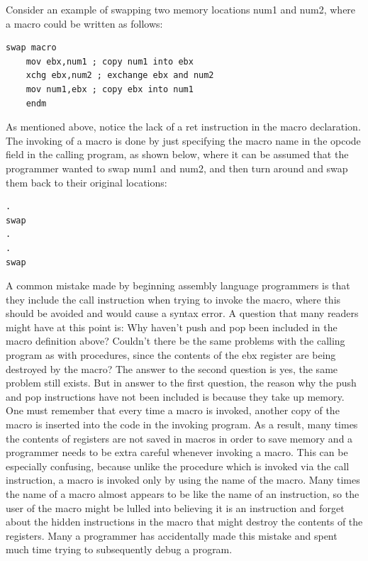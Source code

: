 \documentclass[10pt]{book}
\begin{document}
Consider an example of swapping two memory locations num1 and num2, where a macro could be written as follows:

\begin{verbatim}
swap macro
    mov ebx,num1 ; copy num1 into ebx
    xchg ebx,num2 ; exchange ebx and num2
    mov num1,ebx ; copy ebx into num1
    endm
\end{verbatim}

As mentioned above, notice the lack of a ret instruction in the macro declaration. The invoking of a macro is done by just specifying the macro name in the opcode field in the calling program, as shown below, where it can be assumed that the programmer wanted to swap num1 and num2, and then turn around and swap them back to their original locations:

\begin{verbatim}
.
swap
.
.
swap
\end{verbatim}

A common mistake made by beginning assembly language programmers is that they include the call instruction when trying to invoke the macro, where this should be avoided and would cause a syntax error. A question that many readers might have at this point is: Why haven't push and pop been included in the macro definition above? Couldn't there be the same problems with the calling program as with procedures, since the contents of the ebx register are being destroyed by the macro? The answer to the second question is yes, the same problem still exists. But in answer to the first question, the reason why the push and pop instructions have not been included is because they take up memory. One must remember that every time a macro is invoked, another copy of the macro is inserted into the code in the invoking program. As a result, many times the contents of registers are not saved in macros in order to save memory and a programmer needs to be extra careful whenever invoking a macro.
This can be especially confusing, because unlike the procedure which is invoked via the call instruction, a macro is invoked only by using the name of the macro. Many times the name of a macro almost appears to be like the name of an instruction, so the user of the macro might be lulled into believing it is an instruction and forget about the hidden instructions in the macro that might destroy the contents of the registers. Many a programmer has accidentally made this mistake and spent much time trying to subsequently debug a program.
\end{document}
